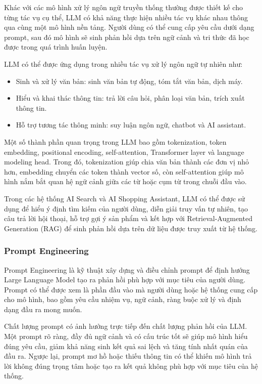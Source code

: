 Khác với các mô hình xử lý ngôn ngữ truyền thống thường được thiết kế cho từng tác vụ cụ thể, LLM có khả năng thực hiện nhiều tác vụ khác nhau thông qua cùng một mô hình nền tảng. Người dùng có thể cung cấp yêu cầu dưới dạng prompt, sau đó mô hình sẽ sinh phản hồi dựa trên ngữ cảnh và tri thức đã học được trong quá trình huấn luyện.

LLM có thể được ứng dụng trong nhiều tác vụ xử lý ngôn ngữ tự nhiên như:

\begin{itemize}
    \item Sinh và xử lý văn bản: sinh văn bản tự động, tóm tắt văn bản, dịch máy.
    \item Hiểu và khai thác thông tin: trả lời câu hỏi, phân loại văn bản, trích xuất thông tin.
    \item Hỗ trợ tương tác thông minh: suy luận ngôn ngữ, chatbot và AI assistant.
\end{itemize}

Một số thành phần quan trọng trong LLM bao gồm tokenization, token embedding, positional encoding, self-attention, Transformer layer và language modeling head. Trong đó, tokenization giúp chia văn bản thành các đơn vị nhỏ hơn, embedding chuyển các token thành vector số, còn self-attention giúp mô hình nắm bắt quan hệ ngữ cảnh giữa các từ hoặc cụm từ trong chuỗi đầu vào.

Trong các hệ thống AI Search và AI Shopping Assistant, LLM có thể được sử dụng để hiểu ý định tìm kiếm của người dùng, diễn giải truy vấn tự nhiên, tạo câu trả lời hội thoại, hỗ trợ gợi ý sản phẩm và kết hợp với Retrieval-Augmented Generation (RAG) để sinh phản hồi dựa trên dữ liệu được truy xuất từ hệ thống.

\subsubsection{Prompt Engineering}
Prompt Engineering là kỹ thuật xây dựng và điều chỉnh prompt để định hướng Large Language Model tạo ra phản hồi phù hợp với mục tiêu của người dùng. Prompt có thể được xem là phần đầu vào mà người dùng hoặc hệ thống cung cấp cho mô hình, bao gồm yêu cầu nhiệm vụ, ngữ cảnh, ràng buộc xử lý và định dạng đầu ra mong muốn.

Chất lượng prompt có ảnh hưởng trực tiếp đến chất lượng phản hồi của LLM. Một prompt rõ ràng, đầy đủ ngữ cảnh và có cấu trúc tốt sẽ giúp mô hình hiểu đúng yêu cầu, giảm khả năng sinh kết quả sai lệch và tăng tính nhất quán của đầu ra. Ngược lại, prompt mơ hồ hoặc thiếu thông tin có thể khiến mô hình trả lời không đúng trọng tâm hoặc tạo ra kết quả không phù hợp với mục tiêu của hệ thống.

